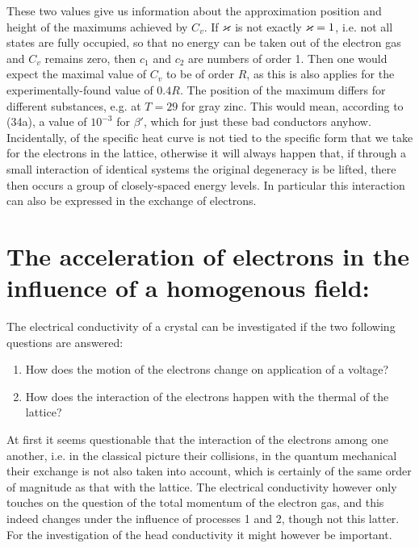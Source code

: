 \begin{paper}{1}
These two values give us information about the approximation position and height of the maximums achieved by $C_v$. If $\varkappa$ is not exactly $\varkappa=1$, i.e. not all states are fully occupied, so that no energy can be taken out of the electron gas and $C_v$ remains zero, then $c_1$ and $c_2$ are numbers of order 1. Then one would expect the maximal value of $C_v$ to be of order $R$, as this is also applies for the experimentally-found value of $0.4R$. The position of the maximum differs for different substances, e.g. at $T=29$ for gray zinc. This would mean, according to (34a), a value of $10^{-3}$ for $\beta'$, which  for just these bad conductors anyhow. Incidentally,  of the specific heat curve is not tied to the specific form that we take for the electrons in the lattice, otherwise it will always happen that, if through a small interaction of identical systems the original degeneracy is be lifted, there then occurs a group of closely-spaced energy levels. In particular this interaction can also be expressed in the exchange of electrons.

\section{The acceleration of electrons in the influence of a homogenous field:} The electrical conductivity of a crystal can be investigated if the two following questions are answered:

\begin{enumerate}
	\item How does the motion of the electrons change on application of a voltage?
	\item How does the interaction of the electrons happen with the thermal  of the lattice?
\end{enumerate}

At first it seems questionable that the interaction of the electrons among one another, i.e. in the classical picture their collisions, in the quantum mechanical their exchange is not also taken into account, which is certainly of the same order of magnitude as that with the lattice. The electrical conductivity however only touches on the question of the total momentum of the electron gas, and this indeed changes under the influence of processes 1 and 2, though not this latter. For the investigation of the head conductivity it might however be important.


\end{paper}
